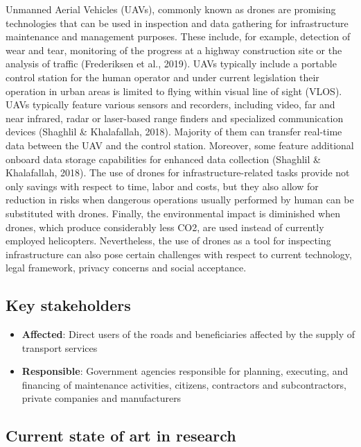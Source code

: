 \documentclass[
]{book}
\providecommand{\tightlist}{%
  \setlength{\itemsep}{0pt}\setlength{\parskip}{0pt}}
\begin{document}
Unmanned Aerial Vehicles (UAVs), commonly known as drones are promising technologies that can be used in inspection and data gathering for infrastructure maintenance and management purposes. These include, for example, detection of wear and tear, monitoring of the progress at a highway construction site or the analysis of traffic (Frederiksen et al., 2019). UAVs typically include a portable control station for the human operator and under current legislation their operation in urban areas is limited to flying within visual line of sight (VLOS). UAVs typically feature various sensors and recorders, including video, far and near infrared, radar or laser-based range finders and specialized communication devices (Shaghlil \& Khalafallah, 2018). Majority of them can transfer real-time data between the UAV and the control station. Moreover, some feature additional onboard data storage capabilities for enhanced data collection (Shaghlil \& Khalafallah, 2018). The use of drones for infrastructure-related tasks provide not only savings with respect to time, labor and costs, but they also allow for reduction in risks when dangerous operations usually performed by human can be substituted with drones. Finally, the environmental impact is diminished when drones, which produce considerably less CO2, are used instead of currently employed helicopters. Nevertheless, the use of drones as a tool for inspecting infrastructure can also pose certain challenges with respect to current technology, legal framework, privacy concerns and social acceptance.

\hypertarget{key-stakeholders-3}{%
\subsection*{Key stakeholders}\label{key-stakeholders-3}}

\begin{itemize}
\tightlist
\item
  \textbf{Affected}: Direct users of the roads and beneficiaries affected by the supply of transport services
\item
  \textbf{Responsible}: Government agencies responsible for planning, executing, and financing of maintenance activities, citizens, contractors and subcontractors, private companies and manufacturers
\end{itemize}

\hypertarget{current-state-of-art-in-research-3}{%
\subsection*{Current state of art in research}\label{current-state-of-art-in-research-3}}
\end{document}
